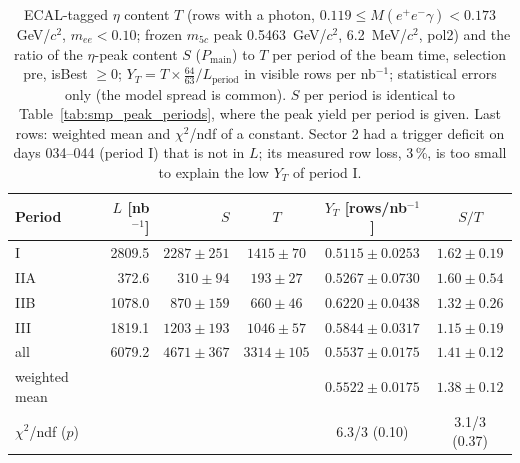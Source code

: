 \begin{table}[H]
\centering\small
\setlength{\tabcolsep}{4pt}
\caption{ECAL-tagged $\eta$ content $T$ (rows with a photon, $0.119\leq M(e^+e^-\gamma)<0.173$~GeV/$c^2$, $m_{ee}<0.10$; frozen $m_{5c}$ peak 0.5463~GeV/$c^2$, 6.2~MeV/$c^2$, pol2) and the ratio of the $\eta$-peak content $S$ ($P_\mathrm{main}$) to $T$ per period of the beam time, selection pre, isBest $\geq0$; $Y_T=T\times\frac{64}{63}/L_\mathrm{period}$ in visible rows per nb$^{-1}$; statistical errors only (the model spread is common). $S$ per period is identical to Table~\ref{tab:smp_peak_periods}, where the peak yield per period is given. Last rows: weighted mean and $\chi^2$/ndf of a constant. Sector 2 had a trigger deficit on days 034--044 (period I) that is not in $L$; its measured row loss, 3\,\%, is too small to explain the low $Y_T$ of period I.}
\label{tab:res_period}
\begin{tabular}{lrrccc}
\toprule
Period & $L$ [nb$^{-1}$] & $S$ & $T$ & $Y_T$ [rows/nb$^{-1}$] & $S/T$ \\
\midrule
I & 2809.5 & $2287\pm251$ & $1415\pm70$ & $0.5115\pm0.0253$ & $1.62\pm0.19$ \\
IIA & 372.6 & $310\pm94$ & $193\pm27$ & $0.5267\pm0.0730$ & $1.60\pm0.54$ \\
IIB & 1078.0 & $870\pm159$ & $660\pm46$ & $0.6220\pm0.0438$ & $1.32\pm0.26$ \\
III & 1819.1 & $1203\pm193$ & $1046\pm57$ & $0.5844\pm0.0317$ & $1.15\pm0.19$ \\
\midrule
all & 6079.2 & $4671\pm367$ & $3314\pm105$ & $0.5537\pm0.0175$ & $1.41\pm0.12$ \\
weighted mean & & & & $0.5522\pm0.0175$ & $1.38\pm0.12$ \\
$\chi^2$/ndf ($p$) & & & & 6.3/3 (0.10) & 3.1/3 (0.37) \\
\bottomrule
\end{tabular}
\end{table}
